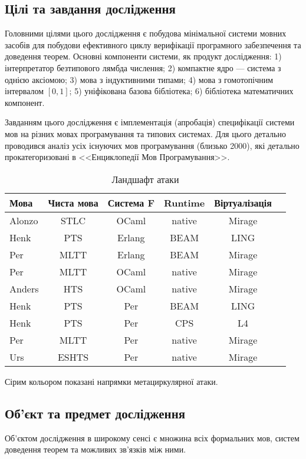 \subsection{Цілі та завдання дослідження}
Головними цілями цього дослідження є побудова мінімальної системи
мовних засобів для побудови ефективного циклу верифікації програмного
забезпечення та доведення теорем. Основні компоненти системи, як продукт дослідження:
1) інтерпретатор безтипового лямбда числення;
2) компактне ядро --- система з однією аксіомою;
3) мова з індуктивними типами;
4) мова з гомотопічним інтервалом $[0,1]$;
5) уніфікована базова бібліотека;
6) бібліотека математичних компонент.

Завданням цього дослідження є імплементація (апробація)
специфікації системи мов на різних мовах програмування та типових системах.
Для цього детально проводився аналіз усіх існуючих мов
програмування (близько 2000), які детально прокатегоризовані
в <<Енциклопедії Мов Програмування>>.

\begin{table}
 \caption{Ландшафт атаки}
  \begin{tabular}{lccccc}
    \hline
       \textbf{Мова} & \textbf{Чиста мова} & \textbf{Система F} & \textbf{Runtime} & \textbf{Віртуалізація} \\
    \hline
 Alonzo            & STLC      & OCaml   & native & Mirage \\
 Henk              & PTS       & Erlang  & BEAM   & LING \\
 Per               & MLTT      & Erlang  & BEAM   & Mirage \\
 Per               & MLTT      & OCaml   & native & Mirage \\
 Anders            & HTS       & OCaml   & native & Mirage \\
    \hline
    \rowcolor{LightGray}
 Henk              & PTS       & Per     & BEAM   & LING \\
    \rowcolor{LightGray}
 Henk              & PTS       & Per     & CPS    & L4 \\
    \rowcolor{LightGray}
 Per               & MLTT      & Per     & native & Mirage \\
    \rowcolor{LightGray}
 Urs               & ESHTS     & Per     & native & Mirage \\
    \hline
  \end{tabular}
  \small Сірим кольором показані напрямки метациркулярної атаки.
\end{table}

\subsection{Об'єкт та предмет дослідження}
Об'єктом дослідження в широкому сенсі є множина
всіх формальних мов, систем доведення теорем та можливих зв'язків між ними.

